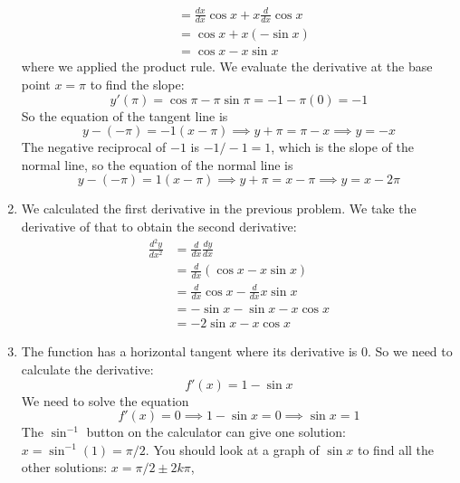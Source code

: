 \documentclass{article}
\begin{document}
\begin{enumerate}
\begin{align*}
    \\
       &= \frac{dx}{dx} \cos x + x \frac{d}{dx} \cos x
    \\
       &= \cos x + x (-\sin x)
    \\
       &= \cos x - x \sin x
  \end{align*}
  where we applied the product rule.  We evaluate the derivative at
  the base point $x=\pi$ to find the slope:
  \begin{equation*}
    y'(\pi) = \cos\pi - \pi \sin \pi = -1 - \pi (0) = -1
  \end{equation*}
  So the equation of the tangent line is
  \begin{equation*}
    y - (-\pi) = -1 (x - \pi)
    \implies y + \pi = \pi - x
    \implies y = -x
  \end{equation*}
  The negative reciprocal of $-1$ is $-1/-1 = 1$, which is the slope
  of the normal line, so the equation of the normal line is
  \begin{equation*}
    y - (-\pi) = 1 (x -\pi)
    \implies
    y + \pi = x -\pi
    \implies
    y = x - 2\pi
  \end{equation*}
\item %
  We calculated the first derivative in the previous problem.  We take
  the derivative of that to obtain the second derivative:
  \begin{align*}
    \frac{d^2y}{dx^2} &= \frac{d}{dx} \frac{dy}{dx}
    \\
                      &= \frac{d}{dx} (\cos x - x \sin x)
    \\
                      &= \frac{d}{dx} \cos x - \frac{d}{dx} x\sin x
    \\
                      &= -\sin x - \sin x - x \cos x
    \\
                      &= -2\sin x - x \cos x
  \end{align*}
\item %
  The function has a horizontal tangent where its derivative is $0$.
  So we need to calculate the derivative:
  \begin{equation*}
    f'(x) = 1 - \sin x
  \end{equation*}
  We need to solve the equation
  \begin{equation*}
    f'(x) = 0 \implies 1 - \sin x = 0 \implies \sin x = 1
  \end{equation*}
  The $\sin^{-1}$ button on the calculator can give one solution: $x =
  \sin^{-1} (1) = \pi/2$.  You should look at a graph of $\sin x$ to
  find all the other solutions: $x = \pi/2 \pm 2k\pi$,

\end{enumerate}
\end{document}
